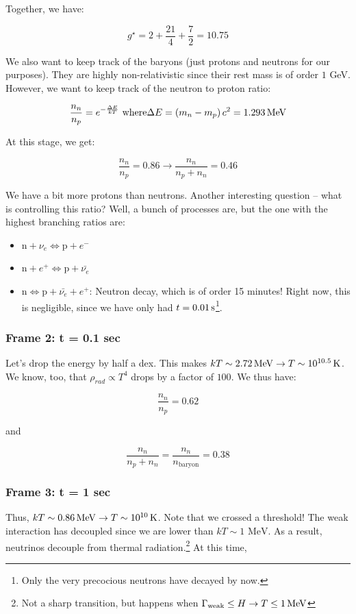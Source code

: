 \documentclass{article}
\newcommand{\unit}[1]{{\,\rm #1}}
\newcommand{\be}{\begin{equation}}
\newcommand{\ee}{\end{equation}}
\newcommand{\s}{\unit{s}}
\def\iff{\Leftrightarrow}
\def\iff{\Leftrightarrow}
\begin{document}
Together, we have:

\be
g^\star = 2 + \frac{21}{4} + \frac72 = 10.75
\ee

We also want to keep track of the baryons (just protons and neutrons for our purposes). They are highly non-relativistic since their rest mass is of order $1$ GeV. However, we want to keep track of the neutron to proton ratio:

\be
\frac{n_n}{n_p} = e^{-\frac{\Delta E}{kT}} \text{ where} \Delta E = \left(m_n - m_p\right) c^2 = 1.293 \unit{ MeV}
\ee

At this stage, we get:

\be
\frac{n_n}{n_p} = 0.86 \rightarrow \boxed{\frac{n_n}{n_p + n_n} = 0.46}
\ee

We have a bit more protons than neutrons. Another interesting question -- what is controlling this ratio? Well, a bunch of processes are, but the one with the highest branching ratios are:

\begin{itemize}
    \item $\text{n} + \nu_e \iff \text{p} + e^{-}$
    \item $\text{n} + e^{+} \iff \text{p} + \bar{\nu_e}$
    \item $\text{n} \iff \text{p} + \bar{\nu_e} + e^{+}$: Neutron decay, which is of order 15 minutes! Right now, this is negligible, since we have only had $t = 0.01 \s$\footnote{Only the very precocious neutrons have decayed by now.}.
\end{itemize}

\subsubsection{Frame 2: t = 0.1 sec}

Let's drop the energy by half a dex. This makes $kT \sim 2.72 \unit{ MeV} \rightarrow T \sim 10^{10.5} \unit{ K}$. We know, too, that $\rho_{rad}\propto T^4$ drops by a  factor of $100$. We thus have:

\be
\frac{n_n}{n_p} = 0.62
\ee

and

\be
\frac{n_n}{n_p + n_n} = \frac{n_n}{n_\text{baryon}} = 0.38
\ee

\subsubsection{Frame 3: t = 1 sec}

Thus, $kT \sim 0.86 \unit{ MeV} \rightarrow T \sim 10^{10} \unit{ K}$. Note that we crossed a threshold! The weak interaction has decoupled since we are lower than $kT \sim 1 \text{ MeV}$. As a result, neutrinos decouple from thermal radiation.\footnote{Not a sharp transition, but happens when $\Gamma_\text{weak} \leq H \rightarrow T \leq 1 \unit{ MeV}$} At this time,
\end{document}

